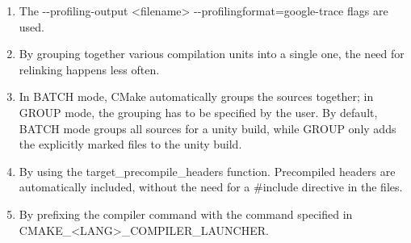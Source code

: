 

\begin{enumerate}
\item 
The -{}-profiling-output <filename> -{}-profilingformat=google-trace flags are used.

\item
By grouping together various compilation units into a single one, the need for relinking happens less often.

\item 
In BATCH mode, CMake automatically groups the sources together; in GROUP mode, the grouping has to be specified by the user. By default, BATCH mode groups all sources for a unity build, while GROUP only adds the explicitly marked files to the unity build.

\item 
By using the target\_precompile\_headers function. Precompiled headers are automatically included, without the need for a \#include directive in the files.

\item 
By prefixing the compiler command with the command specified in CMAKE\_<LANG>\_COMPILER\_LAUNCHER.
\end{enumerate}